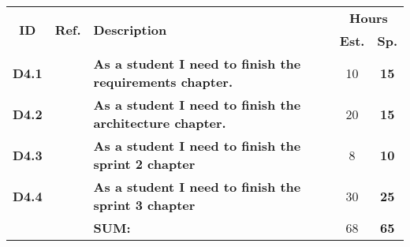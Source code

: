   \label{tab:sprint4Documentationstories}
 \def\arraystretch{1.25}
 
\begin{longtable}{ccXcc}

\toprule[0.5mm]
\multirow{2}{*}{\textbf{ID}} &
\multirow{2}{*}{\textbf{Ref.}} & \multirow{2}{*}{\textbf{Description}} & \multicolumn{2}{c}{\textbf{Hours}} \\
 					& & & \textbf{Est.} & \textbf{Sp.} \\
\midrule

\textbf{D4.1} 	&   & {\bf As a student I need to finish the requirements chapter.} 			& 	10	& \textbf{ 15} \\

\textbf{D4.2} 	&   & {\bf As a student I need to finish the architecture chapter.} 			& 	20  & \textbf{ 15} \\
	
\textbf{D4.3} 	&	& {\bf As a student I need to finish the sprint 2 chapter} 					&   8  	& \textbf{10} \\

\textbf{D4.4} 	&	& {\bf As a student I need to finish the sprint 3 chapter} 					& 	30 	& \textbf{25} \\


\midrule
		
				&	& \textbf{SUM:}		&		68	& \textbf{65}
 \\																			
\bottomrule[0.5mm]
\end{longtable}

